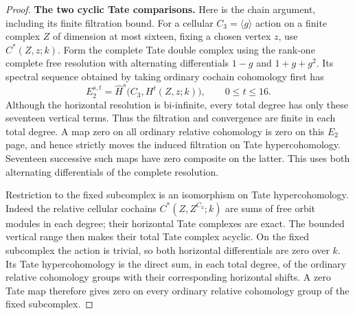 \begin{proof}
\par\medskip\noindent\textbf{The two cyclic Tate comparisons.}\quad
Here is the chain argument, including its finite filtration bound.
For a cellular $C_3=\langle g\rangle$ action on a finite complex
$Z$ of dimension at most sixteen, fixing a chosen vertex $z$, use
$C^*(Z,z;k)$.  Form the complete Tate double complex using the
rank-one complete free resolution with alternating differentials
$1-g$ and $1+g+g^2$.  Its spectral sequence obtained by taking
ordinary cochain cohomology first has
\[
 E_2^{s,t}=\widehat H^s\bigl(C_3,H^t(Z,z;k)\bigr),
                    \qquad 0\leq t\leq16.
                                                               \tag{ECR.14}
\]
Although the horizontal resolution is bi-infinite, every total
degree has only these seventeen vertical terms.  Thus the filtration
and convergence are finite in each total degree.  A map zero on all
ordinary relative cohomology is zero on this $E_2$ page, and hence
strictly moves the induced filtration on Tate hypercohomology.
Seventeen successive such maps have zero composite on the latter.
This uses both alternating differentials of the complete resolution.

Restriction to the fixed subcomplex is an isomorphism on Tate
hypercohomology.  Indeed the relative cellular cochains
$C^*(Z,Z^{C_3};k)$ are sums of free orbit modules in each degree;
their horizontal Tate complexes are exact.  The bounded vertical
range then makes their total Tate complex acyclic.  On the fixed
subcomplex the action is trivial, so both horizontal differentials
are zero over $k$.  Its Tate hypercohomology is the direct sum, in
each total degree, of the ordinary relative cohomology groups with
their corresponding horizontal shifts.  A zero Tate map therefore
gives zero on every ordinary relative cohomology group of the fixed
subcomplex.


\end{proof}

